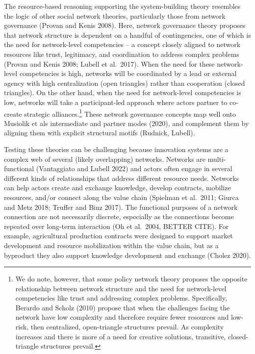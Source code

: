 \documentclass[twoside,12pt,final]{ucthesis-CA2012}
\begin{document}
\begin{ucmainmatter}
The resource-based reasoning supporting the system-building theory
resembles the logic of other social network theories, particularly those
from network governance (Provan and Kenis 2008). Here, network
governance theory proposes that network structure is dependent on a
handful of contingencies, one of which is the \textquotesingle need for network-level
competencies\textquotesingle{} -- a concept closely aligned to network resources like
trust, legitimacy, and coordination to address complex problems (Provan
and Kenis 2008; Lubell et al.~2017). When the need for these
network-level competencies is high, networks will be coordinated by a
lead or external agency with high centralization (open triangles) rather
than cooperation (closed triangles). On the other hand, when the need
for network-level competencies is low, networks will take a
participant-led approach where actors partner to co-create strategic
alliances.\footnote{We do note, however, that some policy network theory proposes the
  opposite relationship between network structure and the need for
  network-level competencies like trust and addressing complex
  problems. Specifically, Berardo and Scholz (2010) propose that when
  the challenges facing the network have low complexity and therefore
  require fewer resources and low-risk, then centralized,
  open-triangle structures prevail. As complexity increases and there
  is more of a need for creative solutions, transitive,
  closed-triangle structures prevail.} These network governance concepts map well onto Musiolik
et al\textquotesingle s intermediate and partner modes (2020), and complement them by
aligning them with explicit structural motifs (Rudnick, Lubell).

Testing these theories can be challenging because innovation systems are
a complex web of several (likely overlapping) networks. Networks are
multi-functional (Vantaggiato and Lubell 2022) and actors often engage
in several different kinds of relationships that address different
resource needs. Networks can help actors create and exchange knowledge,
develop contracts, mobilize resources, and/or connect along the value
chain (Spielman et al.~2011; Giurca and Metz 2018; Truffer and Binz
2017). The functional purposes of a network connection are not
necessarily discrete, especially as the connections become repeated over
long-term interaction (Oh et al.~2004, BETTER CITE). For example,
agricultural production contracts were designed to support market
development and resource mobilization within the value chain, but as a
byproduct they also support knowledge development and exchange (Cholez
2020).


\end{ucmainmatter}
\end{document}
